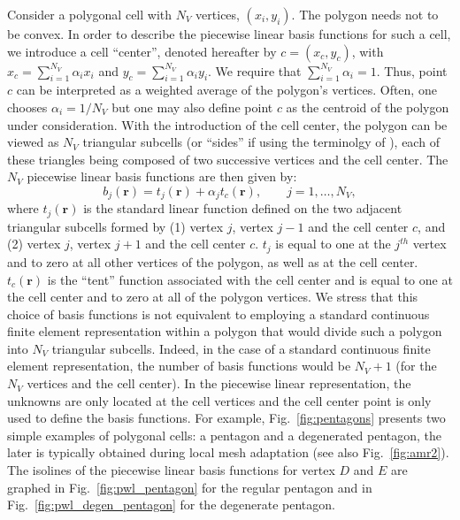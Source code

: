 \documentclass[preprint,10pt]{elsarticle}
\newcommand{\fig}[1]{Fig.~\ref{#1}}                      %
\newcommand\br{\mathbf{r}}
\begin{document}
Consider a polygonal cell with $N_V$ vertices, $(x_i,y_i)$. The polygon needs not 
to be convex. In order to describe the piecewise linear basis functions
for such a cell, we introduce a cell ``center'', denoted hereafter 
by $c=(x_c,y_c)$, with $x_c =\sum_{i=1}^{N_V} \alpha_{i} x_i$
and  $y_c = \sum_{i=1}^{N_V} \alpha_{i} y_i$. We require that
$\sum_{i=1}^{N_V} \alpha_{i} = 1$. Thus, point $c$ can be interpreted as 
a weighted average of the polygon's vertices. Often, one chooses 
$\alpha_i = 1 / N_V$ but one may also define point $c$ as the centroid of the
polygon under consideration.
With the introduction of the cell center, the polygon can be viewed as
$N_V$ triangular subcells (or ``sides'' if using the terminolgy of \cite{bailey}), 
each of these triangles being composed of two
successive vertices and the cell center.
The $N_V$ piecewise linear basis functions are then given by:
%
\begin{equation}
  b_j(\br) = t_j(\br) + \alpha_{j} t_c(\br) , \qquad j=1,\ldots,N_V ,
\end{equation}
%
where $t_j(\br)$ is the standard linear function defined on the two adjacent
triangular subcells formed by (1) vertex $j$, vertex $j-1$ and the cell center $c$,
and (2) vertex $j$, vertex $j+1$ and the cell center $c$.
$t_j$ is equal to one at the $j^{th}$ vertex and to zero at all other vertices of the polygon,
as well as at the cell center.
$t_c(\br)$ is the ``tent'' function associated with the cell center and is equal to one 
at the cell center and to zero at all of the polygon vertices.
%
We stress that this choice of basis functions is not equivalent to employing a standard 
continuous finite element representation within a polygon that would divide such a polygon 
into $N_V$ triangular subcells. Indeed, in the case of a standard continuous finite 
element representation, the number of basis functions would be $N_V+1$ 
(for the $N_V$ vertices and the cell center). In the
piecewise linear representation, the unknowns are only located at the cell 
vertices and the cell center point is only used to define the basis functions.
For example, \fig{fig:pentagons} presents two simple examples of polygonal cells: a 
pentagon and a degenerated pentagon, the later is typically obtained
during local mesh adaptation (see also \fig{fig:amr2}).
The isolines of the piecewise linear basis functions for vertex $D$ and
$E$ are graphed in \fig{fig:pwl_pentagon} for the regular pentagon
and in \fig{fig:pwl_degen_pentagon} for the degenerate pentagon.
%
\end{document}
